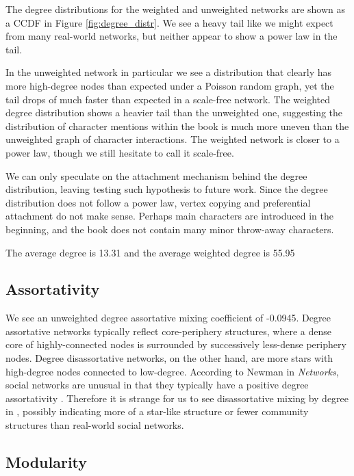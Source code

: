 The degree distributions for the weighted and unweighted networks are shown as a CCDF in Figure \ref{fig:degree_distr}. We see a heavy tail like we might expect from many real-world networks, but neither appear to show a power law in the tail. 

In the unweighted network in particular we see a distribution that clearly has more high-degree nodes than expected under a Poisson random graph, yet the tail drops of much faster than expected in a scale-free network.
The weighted degree distribution shows a heavier tail than the unweighted one, suggesting the distribution of character mentions within the book is much more uneven than the unweighted graph of character interactions. The weighted network is closer to a power law, though we still hesitate to call it scale-free.


We can only speculate on the attachment mechanism behind the degree distribution, leaving testing such hypothesis to future work. Since the degree distribution does not follow a power law, vertex copying and preferential attachment do not make sense. 
Perhaps main characters are introduced in the beginning, and the book does not contain many minor throw-away characters.

The average degree is 13.31 and the average weighted degree is 55.95

\subsection{Assortativity}
We see an unweighted degree assortative mixing coefficient of -0.0945.
Degree assortative networks typically reflect core-periphery structures, where a dense core of highly-connected nodes is surrounded by successively less-dense periphery nodes. Degree disassortative networks, on the other hand, are more stars with high-degree nodes connected to low-degree. 
According to Newman in {\em Networks}, social networks are unusual in that they typically have a positive degree assortativity \cite{NewmanBook}. 
Therefore it is strange for us to see disassortative mixing by degree in \infinitejest, possibly indicating more of a star-like structure or fewer community structures than real-world social networks.

\subsection{Modularity}

